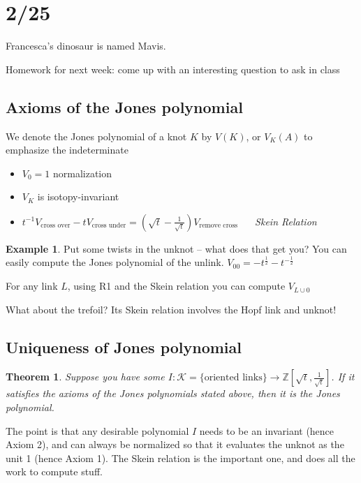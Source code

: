 \documentclass[11pt]{article}
\newcommand{\Z}{\mathbb{Z}}
\newcommand{\K}{\mathcal{K}}
\newcommand{\set}[1]{\{ #1 \}}
\theoremstyle{plain}
\newtheorem{thm}{Theorem}
\theoremstyle{definition}
\newtheorem{ex}{Example}
\begin{document}
\clearpage
\section{2/25}

Francesca's dinosaur is named Mavis.

Homework for next week: come up with an interesting question to ask in class

\subsection{Axioms of the Jones polynomial}

We denote the Jones polynomial of a knot $K$ by $V(K)$, or $V_K(A)$ to emphasize the indeterminate


\begin{itemize}
  \item $V_0 = 1$ normalization
  \item $V_K$ is isotopy-invariant
  \item $t^{-1} V_{\text{cross over}} - t  V_{\text{cross under}} = (\sqrt{t} - \frac{1}{\sqrt{t}})V_{\text{remove cross}}\;\;\;\;\;$ \textit{Skein Relation}
\end{itemize}


\begin{ex}
  Put some twists in the unknot -- what does that get you? You can easily compute the Jones polynomial of the unlink.
  $V_{0 0} = -t^{\frac{1}{2}} - t^{-\frac{1}{2}}$

  For any link $L$, using R1 and the Skein relation you can compute $V_{L \cup 0}$

  What about the trefoil? Its Skein relation involves the Hopf link and unknot!
\end{ex}

\subsection{Uniqueness of Jones polynomial}


\begin{thm}
Suppose you have some $I: \K = \set{\text{oriented links}} \to \Z[\sqrt{t}, \frac{1}{\sqrt{t}}]$.
If it satisfies the axioms of the Jones polynomials stated above, then it is the Jones polynomial.
\end{thm}

The point is that any desirable polynomial $I$ needs to be an invariant (hence Axiom 2), and can always be normalized so that it evaluates the unknot as the unit 1 (hence Axiom 1). The Skein relation is the important one, and does all the work to compute stuff.
\end{document}
